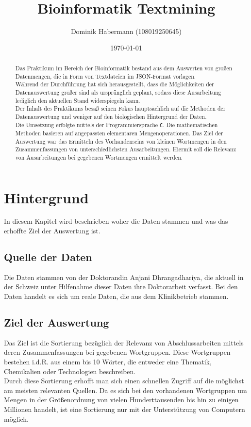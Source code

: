 \documentclass[a4paper,10pt]{article}
\title{Bioinformatik Textmining}
\author{Dominik Habermann (108019250645)}
\date{\today}
\newcommand{\dataSource}[0]{Anjani Dhrangadhariya}
\begin{document}
\maketitle

\begin{abstract}
    Das Praktikum im Bereich der Bioinformatik bestand aus dem Auswerten von großen Datenmengen, die in Form von Textdateien im JSON-Format vorlagen.\\
    Während der Durchführung hat sich herausgestellt, dass die Möglichkeiten der Datenauswertung größer sind als ursprünglich geplant, sodass diese Ausarbeitung lediglich den aktuellen Stand widerspiegeln kann.\\
    Der Inhalt des Praktikums besaß seinen Fokus hauptsächlich auf die Methoden der Datenauswertung und weniger auf den biologischen Hintergrund der Daten.\\

    Die Umsetzung erfolgte mittels der Programmiersprache \texttt{C}. Die mathematischen Methoden basieren auf angepassten elementaren Mengenoperationen. Das Ziel der Auswertung war das Ermitteln des Vorhandenseins von kleinen Wortmengen in den Zusammenfassungen von unterschiedlichsten Ausarbeitungen. Hiermit soll die Relevanz von Ausarbeitungen bei gegebenen Wortmengen ermittelt werden.
\end{abstract}

\section{Hintergrund}
    In diesem Kapitel wird beschrieben woher die Daten stammen und was das erhoffte Ziel der Auswertung ist.

    \subsection{Quelle der Daten}
        Die Daten stammen von der Doktorandin \dataSource, die aktuell in der Schweiz unter Hilfenahme dieser Daten ihre Doktorarbeit verfasst. Bei den Daten handelt es sich um reale Daten, die aus dem Klinikbetrieb stammen.

    \subsection{Ziel der Auswertung}
        Das Ziel ist die Sortierung bezüglich der Relevanz von Abschlussarbeiten mittels deren Zusammenfassungen bei gegebenen Wortgruppen. Diese Wortgruppen bestehen i.d.R. aus einem bis 10 Wörter, die entweder eine Thematik, Chemikalien oder Technologien beschreiben.\\
        Durch diese Sortierung erhofft man sich einen schnellen Zugriff auf die möglichst am meisten relevanten Quellen. Da es sich bei den vorhandenen Wortgruppen um Mengen in der Größenordnung von vielen Hunderttausenden bis hin zu einigen Millionen handelt, ist eine Sortierung nur mit der Unterstützung von Computern möglich.
\end{document}
